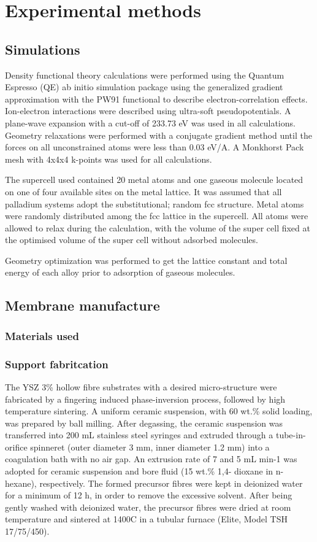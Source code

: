 \chapter{Experimental methods}

\section{Simulations}
Density functional theory calculations were performed using the Quantum Espresso (QE) ab 
initio simulation package using the generalized gradient approximation with the PW91 
functional to describe electron-correlation effects. Ion-electron interactions were described 
using ultra-soft pseudopotentials. A plane-wave expansion with a cut-off of 233.73 eV was used 
in all calculations. Geometry relaxations were performed with a conjugate gradient method until 
the forces on all unconstrained atoms were less than 0.03 eV/A. A Monkhorst Pack mesh with 
4x4x4 k-points was used for all calculations.

The supercell used contained 20 metal atoms and one gaseous molecule located on one of four 
available sites on the metal lattice. It was assumed that all palladium systems adopt the 
substitutional; random fcc structure. Metal atoms were randomly distributed among the fcc 
lattice in the supercell. All atoms were allowed to relax during the calculation, with the 
volume of the super cell fixed at the optimised volume of the super cell without adsorbed 
molecules. 

Geometry optimization was performed to get the lattice constant and total energy of each 
alloy prior to adsorption of gaseous molecules. 

\section{Membrane manufacture}

\subsection{Materials used}
\subsection{Support fabritcation}
The YSZ 3\% hollow fibre substrates with a desired micro-structure were fabricated by a 
fingering induced phase-inversion process, followed by high temperature sintering. A uniform 
ceramic suspension, with 60 wt.\% solid loading, was prepared by ball milling. After degassing, 
the ceramic suspension was transferred into 200 mL stainless steel syringes and extruded 
through a tube-in-orifice spinneret (outer diameter 3 mm, inner diameter 1.2 mm) into a 
coagulation bath with no air gap. An extrusion rate of 7 and 5 mL min-1 was adopted for 
ceramic suspension and bore fluid (15 wt.\% 1,4- dioxane in n-hexane), respectively. The formed 
precursor fibres were kept in deionized water for a minimum of 12 h, in order to remove the 
excessive solvent. After being gently washed with deionized water, the precursor fibres were 
dried at room temperature and sintered at 1400\textdegree C in a tubular furnace (Elite, Model TSH 
17/75/450).
